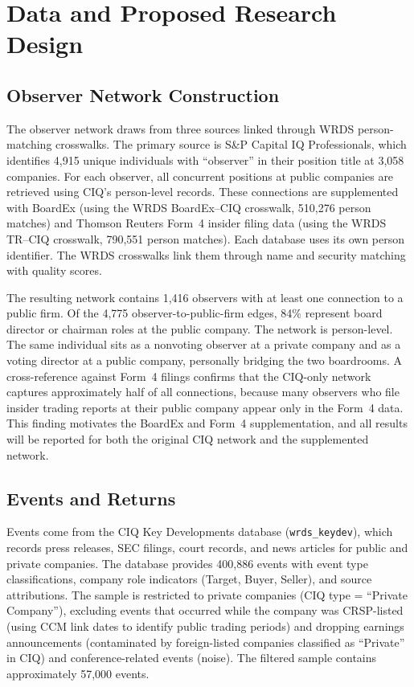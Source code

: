 \section{Data and Proposed Research Design}
\label{sec:data}

\subsection{Observer Network Construction}

The observer network draws from three sources linked through WRDS person-matching crosswalks. The primary source is S\&P Capital IQ Professionals, which identifies 4,915 unique individuals with ``observer'' in their position title at 3,058 companies. For each observer, all concurrent positions at public companies are retrieved using CIQ's person-level records. These connections are supplemented with BoardEx (using the WRDS BoardEx--CIQ crosswalk, 510,276 person matches) and Thomson Reuters Form~4 insider filing data (using the WRDS TR--CIQ crosswalk, 790,551 person matches). Each database uses its own person identifier. The WRDS crosswalks link them through name and security matching with quality scores.

The resulting network contains 1,416 observers with at least one connection to a public firm. Of the 4,775 observer-to-public-firm edges, 84\% represent board director or chairman roles at the public company. The network is person-level. The same individual sits as a nonvoting observer at a private company and as a voting director at a public company, personally bridging the two boardrooms. A cross-reference against Form~4 filings confirms that the CIQ-only network captures approximately half of all connections, because many observers who file insider trading reports at their public company appear only in the Form~4 data. This finding motivates the BoardEx and Form~4 supplementation, and all results will be reported for both the original CIQ network and the supplemented network.

\subsection{Events and Returns}

Events come from the CIQ Key Developments database (\texttt{wrds\_keydev}), which records press releases, SEC filings, court records, and news articles for public and private companies. The database provides 400,886 events with event type classifications, company role indicators (Target, Buyer, Seller), and source attributions. The sample is restricted to private companies (CIQ type = ``Private Company''), excluding events that occurred while the company was CRSP-listed (using CCM link dates to identify public trading periods) and dropping earnings announcements (contaminated by foreign-listed companies classified as ``Private'' in CIQ) and conference-related events (noise). The filtered sample contains approximately 57,000 events.

